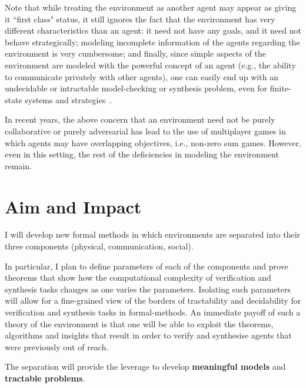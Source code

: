 \documentclass[a4paper,10pt]{article}
\begin{document}
Note that while treating the environment as another agent may appear as giving it ``first class" status, 
it still ignores the fact that the environment has very different characteristics than an agent: 
it need not have any goals, and it need not behave strategically; modeling incomplete information of the agents 
regarding the environment is very cumbersome; and finally, since simple aspects of the environment are modeled
with the powerful concept of an agent (e.g., the ability to communicate
privately with other agents), one can easily end up with an undecidable
or intractable model-checking or synthesis problem, even for finite-state systems
and strategies~\cite{DBLP:journals/tocl/MogaveroMPV14,DBLP:conf/focs/PnueliR90}.

In recent years, the above concern that an environment need not be purely collaborative or purely adversarial has 
lead to the use of multiplayer games in which agents may have overlapping objectives, i.e., non-zero sum games. 
However, even in this setting, the rest of the deficiencies in modeling the environment remain.


\section{Aim and Impact}

\begin{framed}
\noindent
I will develop new formal methods in which environments are separated into their three components (physical, communication, social).
\end{framed}

In particular, I plan to define parameters of each of the components and prove theorems that show how the computational complexity of verification and synthesis tasks changes as one varies the parameters. Isolating such parameters will allow for a fine-grained view of the borders of tractability and decidability for verification and synthesis tasks in formal-methods. An immediate payoff of such a theory of the environment is that one will be able to exploit the theorems, algorithms and insights that result in order to verify and synthesise agents that were previously out of reach.
\begin{framed}
 \noindent 
 The separation  will provide the leverage to develop \textbf{meaningful models} and \textbf{tractable problems}.
\end{framed}
\end{document}
